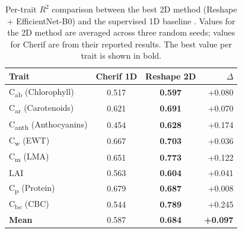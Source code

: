 \begin{table}[htbp]
\centering
\caption{Per-trait $R^2$ comparison between the best 2D method (Reshape + EfficientNet-B0) and the supervised 1D baseline \citep{cherif2025greenhyperspectra}. Values for the 2D method are averaged across three random seeds; values for Cherif are from their reported results. The best value per trait is shown in bold.}
\label{tab:per_trait}
\begin{tabular}{lccr}
\toprule
Trait & Cherif 1D & Reshape 2D & $\Delta$ \\
\midrule
C\textsubscript{ab} (Chlorophyll)    & 0.517 & \textbf{0.597} & +0.080 \\
C\textsubscript{ar} (Carotenoids)    & 0.621 & \textbf{0.691} & +0.070 \\
C\textsubscript{anth} (Anthocyanins) & 0.454 & \textbf{0.628} & +0.174 \\
C\textsubscript{w} (EWT)             & 0.667 & \textbf{0.703} & +0.036 \\
C\textsubscript{m} (LMA)             & 0.651 & \textbf{0.773} & +0.122 \\
LAI                                   & 0.563 & \textbf{0.604} & +0.041 \\
C\textsubscript{p} (Protein)         & 0.679 & \textbf{0.687} & +0.008 \\
C\textsubscript{bc} (CBC)            & 0.544 & \textbf{0.789} & +0.245 \\
\midrule
\textbf{Mean}                         & 0.587 & \textbf{0.684} & \textbf{+0.097} \\
\bottomrule
\end{tabular}
\end{table}
